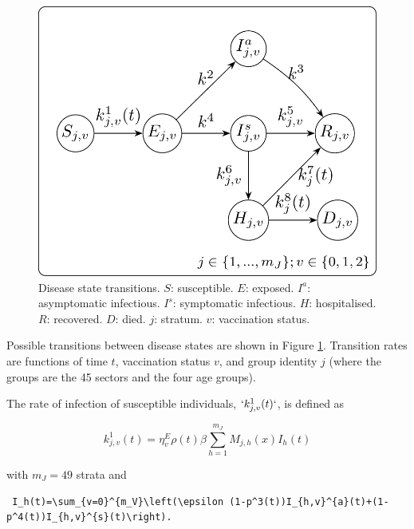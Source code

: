 \documentclass[
]{article}
\makeatletter
\newcounter{figno}
\newenvironment{fignos:no-prefix-figure-caption}{
  \caption@ifcompatibility{}{
    \let\oldthefigure\thefigure
    \let\oldtheHfigure\theHfigure
    \renewcommand{\thefigure}{figno:\thefigno}
    \renewcommand{\theHfigure}{figno:\thefigno}
    \stepcounter{figno}
    \captionsetup{labelformat=empty}
  }
}{
  \caption@ifcompatibility{}{
    \captionsetup{labelformat=default}
    \let\thefigure\oldthefigure
    \let\theHfigure\oldtheHfigure
    \addtocounter{figure}{-1}
  }
}
\makeatother
\begin{document}
\begin{fignos:no-prefix-figure-caption}

\begin{figure}
\centering
\includegraphics{README_files/figure-latex/statetransitions-1.png}
\caption{\label{fig:statetransitions}Disease state transitions. \(S\): susceptible. \(E\): exposed. \(I^{a}\): asymptomatic infectious. \(I^{s}\): symptomatic infectious. \(H\): hospitalised. \(R\): recovered. \(D\): died. \(j\): stratum. \(v\): vaccination status.}
\end{figure}

\end{fignos:no-prefix-figure-caption}

Possible transitions between disease states are shown in Figure \ref{fig:statetransitions}. Transition rates are functions of time \(t\), vaccination status \(v\), and group identity \(j\) (where the groups are the 45 sectors and the four age groups).

The rate of infection of susceptible individuals, \(`k^{1}_{j,v}(t)`\), is defined as

\begin{equation}
k_{j,v}^{1}(t) = \eta_{v}^{E}\rho(t)\beta\sum_{h=1}^{m_J}M_{j,h}(x) I_h(t)
\label{eq:infection}
\end{equation}

with \(m_J=49\) strata and

\begin{verbatim}
 I_h(t)=\sum_{v=0}^{m_V}\left(\epsilon (1-p^3(t))I_{h,v}^{a}(t)+(1-p^4(t))I_{h,v}^{s}(t)\right). 
\end{verbatim}
\end{document}
